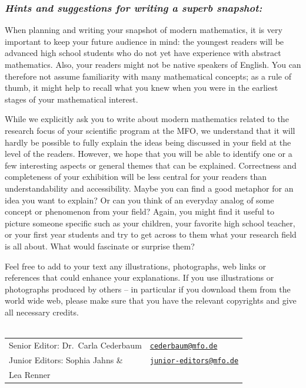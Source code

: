 \documentclass[a4paper,12pt]{article}
\begin{document}
\subsubsection*{\it Hints and suggestions for writing a superb snapshot:}
When planning and writing your snapshot of modern mathematics, it is very important to keep your future audience in mind: the youngest readers will be advanced high school students who do not yet have experience with abstract mathematics. Also, your readers might not be native speakers of English. You can therefore not assume familiarity with many mathematical concepts; as a rule of thumb, it might help to recall what you knew when you were in the earliest stages of your mathematical interest.

While we explicitly ask you to write about modern mathematics related to the research focus of your scientific program at the MFO, we understand that it will hardly be possible to fully explain the ideas being discussed in your field at the level of the readers. However, we hope that you will be able to identify one or a few interesting aspects or general themes that can be explained. Correctness and completeness of your exhibition will be less central for your readers than understandability and accessibility. Maybe you can find a good metaphor for an idea you want to explain? Or can you think of an everyday analog of some concept or phenomenon from your field? Again, you might find it useful to picture someone specific such as your children, your favorite high school teacher, or your first year students and try to get across to them what your research field is all about. What would fascinate or surprise them?

Feel free to add to your text any illustrations, photographs, web links or references that could enhance your explanations. If you use illustrations or photographs produced by others -- in particular if you download them from the world wide web, please make sure that you have the relevant copyrights and give all necessary credits.\\[-1ex]

\\[1ex]
\begin{tabular}{ll}
Senior Editor:\phantom{s} Dr.~Carla Cederbaum &\href{mailto:cederbaum@mfo.de}{\nolinkurl{cederbaum@mfo.de} }\\
Junior Editors: Sophia Jahns \&  &\href{mailto:junior-editors@mfo.de}{\nolinkurl{junior-editors@mfo.de} }\\
\phantom{Junior Editors: }Lea Renner
\end{tabular}
\vspace{2ex}
\end{document}
